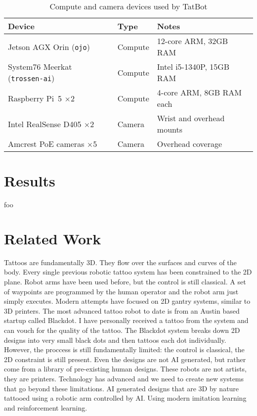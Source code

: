 \documentclass[11pt]{article}
\begin{document}
\begin{table}[h]
    \centering
    \caption{Compute and camera devices used by TatBot}
    \label{tab:hardware-devices}
    \begin{tabular}{lll}
        \toprule
        Device & Type & Notes \\
        \midrule
        Jetson AGX Orin (\texttt{ojo}) & Compute & 12-core ARM, 32GB RAM \\
        System76 Meerkat (\texttt{trossen-ai}) & Compute & Intel i5-1340P, 15GB RAM \\
        Raspberry Pi~5 $\times$2 & Compute & 4-core ARM, 8GB RAM each \\
        Intel RealSense D405 $\times$2 & Camera & Wrist and overhead mounts \\
        Amcrest PoE cameras $\times$5 & Camera & Overhead coverage \\
        \bottomrule
    \end{tabular}
\end{table}

\section{Results}

foo

\section{Related Work}

Tattoos are fundamentally 3D. They flow over the surfaces and curves of the body. Every single previous robotic tattoo system has been constrained to the 2D plane.
Robot arms have been used before, but the control is still classical.
A set of waypoints are programmed by the human operator and the robot arm just simply executes.
Modern attempts have focused on 2D gantry systems, similar to 3D printers.
The most advanced tattoo robot to date is from an Austin based startup called Blackdot.
I have personally received a tattoo from the system and can vouch for the quality of the tattoo.
The Blackdot system breaks down 2D designs into very small black dots and then tattoos each dot individually.
However, the proccess is still fundamentally limited: the control is classical, the 2D constraint is still present.
Even the designs are not AI generated, but rather come from a library of pre-existing human designs.
These robots are not artists, they are printers.
Technology has advanced and we need to create new systems that go beyond these limitations.
AI generated designs that are 3D by nature tattooed using a robotic arm controlled by AI.
Using modern imitation learning and reinforcement learning.
\end{document}
